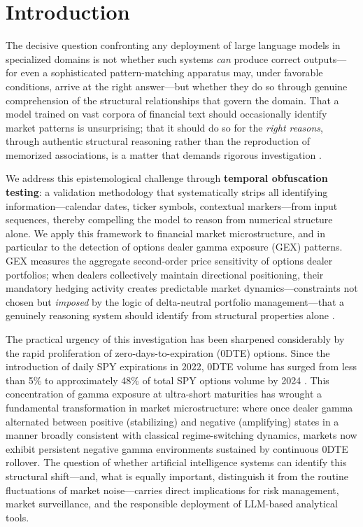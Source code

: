 \section{Introduction}
\label{sec:introduction}

The decisive question confronting any deployment of large language models in specialized domains is not whether such systems \textit{can} produce correct outputs---for even a sophisticated pattern-matching apparatus may, under favorable conditions, arrive at the right answer---but whether they do so through genuine comprehension of the structural relationships that govern the domain. That a model trained on vast corpora of financial text should occasionally identify market patterns is unsurprising; that it should do so for the \textit{right reasons}, through authentic structural reasoning rather than the reproduction of memorized associations, is a matter that demands rigorous investigation \citep{mccoy2023embers}.

We address this epistemological challenge through \textbf{temporal obfuscation testing}: a validation methodology that systematically strips all identifying information---calendar dates, ticker symbols, contextual markers---from input sequences, thereby compelling the model to reason from numerical structure alone. We apply this framework to financial market microstructure, and in particular to the detection of options dealer gamma exposure (GEX) patterns. GEX measures the aggregate second-order price sensitivity of options dealer portfolios; when dealers collectively maintain directional positioning, their mandatory hedging activity creates predictable market dynamics---constraints not chosen but \textit{imposed} by the logic of delta-neutral portfolio management---that a genuinely reasoning system should identify from structural properties alone \citep{ni2005stock,garleanu2009demand}.

The practical urgency of this investigation has been sharpened considerably by the rapid proliferation of zero-days-to-expiration (0DTE) options. Since the introduction of daily SPY expirations in 2022, 0DTE volume has surged from less than 5\% to approximately 48\% of total SPY options volume by 2024 \citep{cboe2024zero,dim2025zero}. This concentration of gamma exposure at ultra-short maturities has wrought a fundamental transformation in market microstructure: where once dealer gamma alternated between positive (stabilizing) and negative (amplifying) states in a manner broadly consistent with classical regime-switching dynamics, markets now exhibit persistent negative gamma environments sustained by continuous 0DTE rollover. The question of whether artificial intelligence systems can identify this structural shift---and, what is equally important, distinguish it from the routine fluctuations of market noise---carries direct implications for risk management, market surveillance, and the responsible deployment of LLM-based analytical tools.


